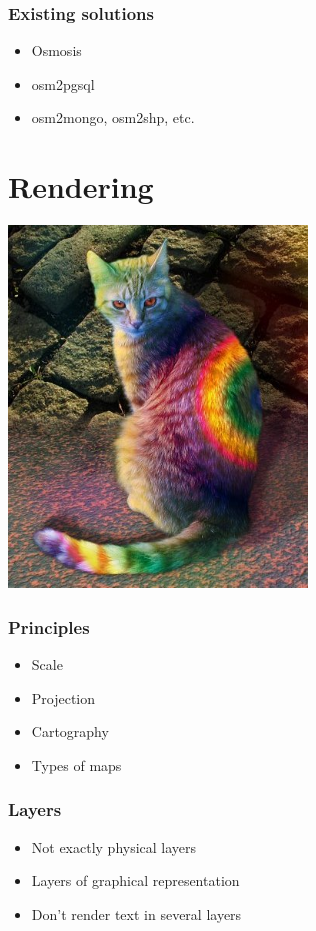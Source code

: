 \documentclass[14pt]{beamer}
\begin{document}
\begin{frame}
  \frametitle{Existing solutions}
  \begin{itemize}
  \item Osmosis
  \item osm2pgsql
  \item osm2mongo, osm2shp, etc.
  \end{itemize}
\end{frame}

\section{Rendering}

\begin{frame}[fragile]
  \begin{center}
    \includegraphics[width=300px]{map.jpg}
  \end{center}
\end{frame}

\begin{frame}
  \frametitle{Principles}
  \begin{itemize}
  \item Scale
  \item Projection
  \item Cartography
  \item Types of maps
  \end{itemize}
\end{frame}

\begin{frame}
  \frametitle{Layers}
  \begin{itemize}
  \item Not exactly physical layers
  \item Layers of graphical representation
  \item Don't render text in several layers
  \end{itemize}
\end{frame}
\end{document}
